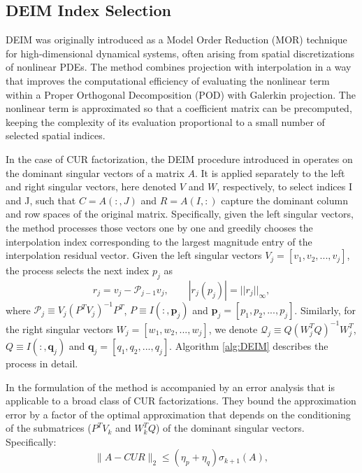 \documentclass[12pt, a4paper]{article}
\def\norm#1{\|#1\|}
\theoremstyle{remark}
\begin{document}
\subsection{DEIM Index Selection}
\hspace{5mm}DEIM was originally introduced as a Model Order Reduction (MOR) technique \cite{chaturantabut2010nonlinear} for high-dimensional dynamical systems, often arising from spatial discretizations of nonlinear PDEs. The method combines projection with interpolation in a way that improves the computational efficiency of evaluating the nonlinear term within a Proper Orthogonal Decomposition (POD) with Galerkin projection. The nonlinear term is approximated so that a coefficient matrix can be precomputed, keeping the complexity of its evaluation proportional to a small number of selected spatial indices. \par 
In the case of CUR factorization, the DEIM procedure introduced in \cite{sorensen2016deim} operates on the dominant singular vectors of a matrix $A$. It is applied separately to the left and right singular vectors, here denoted $V$ and $W$, respectively, to select indices I and J, such that $C = A(:,J)$ and $R = A(I,:)$ capture the dominant column and row spaces of the original matrix. Specifically, given the left singular vectors, the method processes those vectors one by one and greedily chooses the interpolation index corresponding to the largest magnitude entry of the interpolation residual vector.  Given the left singular vectors $V_j = [v_1, v_2, ..., v_j]$, the process selects the next index $p_j$ as 
\[
    r_j = v_j - \mathcal{P}_{j-1}v_j, \qquad   |r_j(p_j)| = ||r_j||_\infty,
\]
where $\mathcal{P}_j \equiv V_j(P^TV_j)^{-1}P^T$, $P \equiv I(:,\mathbf{p}_j)$ and $\mathbf{p}_j = [p_1, p_2, ..., p_j]$. Similarly, for the right singular vectors $W_j =[w_1, w_2, ..., w_j]$, we denote $\mathcal{Q}_j \equiv Q(W_j^T Q)^{-1}W_j^T$, $Q \equiv I(:, \mathbf{q}_j)$ and $\mathbf{q}_j = [q_1, q_2, ..., q_j]$. Algorithm \ref{alg:DEIM} describes the process in detail.\par
In \cite{sorensen2016deim} the formulation of the method is accompanied by an error analysis that is applicable to a broad class of CUR factorizations. They bound the approximation error by a factor of the optimal approximation that depends on the conditioning of the submatrices ($P^TV_k$ and  $W_k^TQ$) of the dominant singular vectors. Specifically: 
\begin{equation*}
    \norm{A-CUR}_2 \leq (\eta_p+\eta_q)\sigma_{k+1}(A),
\end{equation*}
\end{document}
